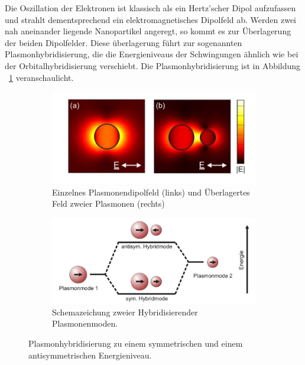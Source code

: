 Die Oszillation der Elektronen ist klassisch als ein Hertz'scher Dipol aufzufassen und strahlt dementsprechend ein elektromagnetisches Dipolfeld ab.
Werden zwei nah aneinander liegende Nanopartikel angeregt, so kommt es zur Überlagerung der beiden Dipolfelder. Diese überlagerung führt zur sogenannten Plasmonhybridisierung, die die Energieniveaus der Schwingungen ähnlich wie bei der Orbitalhybridisierung verschiebt. Die Plasmonhybridisierung ist in Abbildung ~\ref{fig:hybrid} veranschaulicht.
\begin{figure}[H]
  \centering
  \begin{subfigure}{0.49\textwidth}
    \includegraphics[width=\textwidth]{plots/hybrid.jpg}
    \caption{Einzelnes Plasmonendipolfeld (links) und Überlagertes Feld zweier Plasmonen (rechts)}
  \end{subfigure}
  \begin{subfigure}{0.49\textwidth}
    \includegraphics[width=\textwidth]{plots/hybridschema.jpg}
    \caption{Schemazeichung zweier Hybridisierender Plasmonenmoden.}
  \end{subfigure}
  \caption{Plasmonhybridisierung zu einem symmetrischen und einem antisymmetrischen Energieniveau. \cite{bayreuth}}
  \label{fig:hybrid}
\end{figure}

